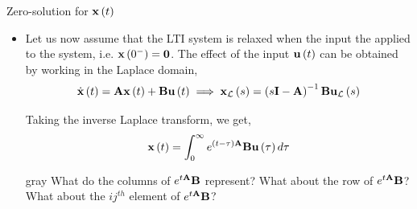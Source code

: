 \documentclass[aspectratio=169]{beamer}
\def\mf{\ensuremath\mathbf}
\def\lp{\ensuremath\left(}
\def\rp{\ensuremath\right)}
\newcommand{\demoexc}[3]{\onslide<#1->\begin{color}{#2} #3 \end{color}}
\newcommand{\ct}[1]{\lp #1\rp}
\begin{document}
\begin{frame}{Zero-solution for $\mf{x}\ct{t}$}
\begin{itemize}
    \item Let us now assume that the LTI system is relaxed when the input the applied to the system, i.e. $\mf{x}\ct{0^-} = \mf{0}$. The effect of the input $\mf{u}\ct{t}$ can be obtained by working in the Laplace domain,
    \[ \dot{\mf{x}}\ct{t} = \mf{A}\mf{x}\ct{t} + \mf{B}\mf{u}\ct{t} \implies \mf{x}_{\mathcal{L}}\ct{s} = \lp s\mf{I} - \mf{A}\rp^{-1}\mf{B}\mf{u}_{\mathcal{L}}\ct{s} \]

    Taking the inverse Laplace transform, we get,
    \[ \mf{x}\ct{t} = \int_{0}^{\infty} e^{\ct{t - \tau}\mf{A}}\mf{B}\mf{u}\ct{\tau}d\tau \]

    \demoexc{2}{gray}{What do the columns of $e^{t\mf{A}}\mf{B}$ represent? What about the row of $e^{t\mf{A}}\mf{B}$? What about the $ij^{th}$ element of $e^{t\mf{A}}\mf{B}$?}
\end{itemize}
\end{frame}
\end{document}
